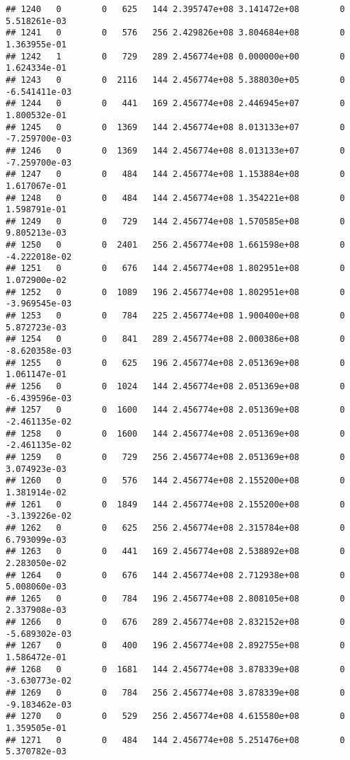 \documentclass[
]{article}
\begin{document}
\begin{enumerate}
\begin{verbatim}
## 1240   0        0   625   144 2.395747e+08 3.141472e+08        0  5.518261e-03
## 1241   0        0   576   256 2.429826e+08 3.804684e+08        0  1.363955e-01
## 1242   1        0   729   289 2.456774e+08 0.000000e+00        0  1.624334e-01
## 1243   0        0  2116   144 2.456774e+08 5.388030e+05        0 -6.541411e-03
## 1244   0        0   441   169 2.456774e+08 2.446945e+07        0  1.800532e-01
## 1245   0        0  1369   144 2.456774e+08 8.013133e+07        0 -7.259700e-03
## 1246   0        0  1369   144 2.456774e+08 8.013133e+07        0 -7.259700e-03
## 1247   0        0   484   144 2.456774e+08 1.153884e+08        0  1.617067e-01
## 1248   0        0   484   144 2.456774e+08 1.354221e+08        0  1.598791e-01
## 1249   0        0   729   144 2.456774e+08 1.570585e+08        0  9.805213e-03
## 1250   0        0  2401   256 2.456774e+08 1.661598e+08        0 -4.222018e-02
## 1251   0        0   676   144 2.456774e+08 1.802951e+08        0  1.072900e-02
## 1252   0        0  1089   196 2.456774e+08 1.802951e+08        0 -3.969545e-03
## 1253   0        0   784   225 2.456774e+08 1.900400e+08        0  5.872723e-03
## 1254   0        0   841   289 2.456774e+08 2.000386e+08        0 -8.620358e-03
## 1255   0        0   625   196 2.456774e+08 2.051369e+08        0  1.061147e-01
## 1256   0        0  1024   144 2.456774e+08 2.051369e+08        0 -6.439596e-03
## 1257   0        0  1600   144 2.456774e+08 2.051369e+08        0 -2.461135e-02
## 1258   0        0  1600   144 2.456774e+08 2.051369e+08        0 -2.461135e-02
## 1259   0        0   729   256 2.456774e+08 2.051369e+08        0  3.074923e-03
## 1260   0        0   576   144 2.456774e+08 2.155200e+08        0  1.381914e-02
## 1261   0        0  1849   144 2.456774e+08 2.155200e+08        0 -3.139226e-02
## 1262   0        0   625   256 2.456774e+08 2.315784e+08        0  6.793099e-03
## 1263   0        0   441   169 2.456774e+08 2.538892e+08        0  2.283050e-02
## 1264   0        0   676   144 2.456774e+08 2.712938e+08        0  5.008060e-03
## 1265   0        0   784   196 2.456774e+08 2.808105e+08        0  2.337908e-03
## 1266   0        0   676   289 2.456774e+08 2.832152e+08        0 -5.689302e-03
## 1267   0        0   400   196 2.456774e+08 2.892755e+08        0  1.586472e-01
## 1268   0        0  1681   144 2.456774e+08 3.878339e+08        0 -3.630773e-02
## 1269   0        0   784   256 2.456774e+08 3.878339e+08        0 -9.183462e-03
## 1270   0        0   529   256 2.456774e+08 4.615580e+08        0  1.359505e-01
## 1271   0        0   484   144 2.456774e+08 5.251476e+08        0  5.370782e-03

\end{verbatim}
\end{enumerate}
\end{document}
